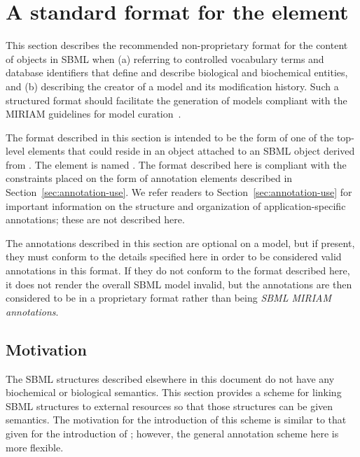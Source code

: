 
\section{A standard format for the  element}
\label{sec:finney-novere}
\label{sec:annotation-standard}

This section describes the recommended non-proprietary format for
the content of \Annotation objects in SBML when (a) referring to
controlled vocabulary terms and database identifiers that define
and describe biological and biochemical entities, and (b)
describing the creator of a model and its modification history.
Such a structured format should facilitate the generation of
models compliant with the MIRIAM guidelines for model
curation~\citep{le_novere:2005}.

The format described in this section is intended to be the form of
one of the top-level elements that could reside in an \Annotation
object attached to an SBML object derived from \SBase.  The
element is named .  The format described here is
compliant with the constraints placed on the form of annotation
elements described in Section~\ref{sec:annotation-use}.  We refer
readers to Section~\ref{sec:annotation-use} for important
information on the structure and organization of
application-specific annotations; these are not described here.

The annotations described in this section are optional on a model,
but if present, they must conform to the details specified here in
order to be considered valid annotations in this format.  If they
do not conform to the format described here, it does not render
the overall SBML model invalid, but the annotations are then
considered to be in a proprietary format rather than being
\emph{SBML MIRIAM annotations}.


\subsection{Motivation}

The SBML structures described elsewhere in this document do not
have any biochemical or biological semantics.  This section
provides a scheme for linking SBML structures to external
resources so that those structures can be given semantics.  The
motivation for the introduction of this scheme is similar to that
given for the introduction of ; however, the
general annotation scheme here is more flexible.


